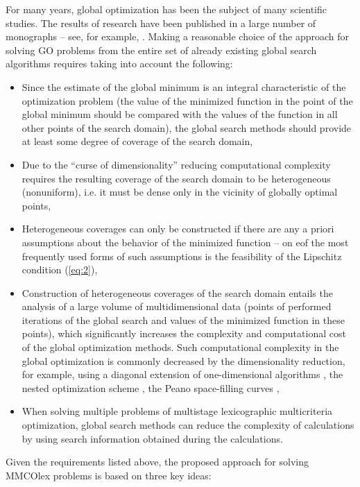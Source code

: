 \documentclass[smallextended]{svjour3}       %
\begin{document}
For many years, global optimization has been the subject of many scientific studies. The results of research have been published in a large number of monographs -- see, for example, \cite{c17,c18,c19,c20,c21,c22,c23,c24,c25}. Making a reasonable choice of the approach for solving GO problems from the entire set of already existing global search algorithms requires taking into account the following:

\begin{itemize}
	\item Since the estimate of the global minimum is an integral characteristic of the optimization problem (the value of the minimized function in the point of the global minimum should be compared with the values of the function in all other points of the search domain), the global search methods should provide at least some degree of coverage of the search domain,
	\item Due to the ``curse of dimensionality'' reducing computational complexity requires the resulting coverage of the search domain to be heterogeneous (nonuniform), i.e. it must be dense only in the vicinity of globally optimal points,
	\item Heterogeneous coverages can only be constructed if there are any a priori assumptions about the behavior of the minimized function -- on eof the most frequently used forms of such assumptions is the feasibility of the Lipschitz condition (\ref{eq:2}),
	\item Construction of heterogeneous coverages of the search domain entails the analysis of a large volume of multidimensional data (points of performed iterations of the global search and values of the minimized function in these points), which significantly increases the complexity and computational cost of the global optimization methods. Such computational complexity in the global optimization is commonly decreased by the dimensionality reduction, for example, using a diagonal extension of one-dimensional algorithms \cite{c22,c45}, the nested optimization scheme \cite{c46,c47}, the Peano space-filling curves \cite{c17,c23},
	\item When solving multiple problems of multistage lexicographic multicriteria optimization, global search methods can reduce the complexity of calculations by using search information obtained during the calculations.
\end{itemize}

Given the requirements listed above, the proposed approach for solving MMCOlex problems is based on three key ideas:
\end{document}

